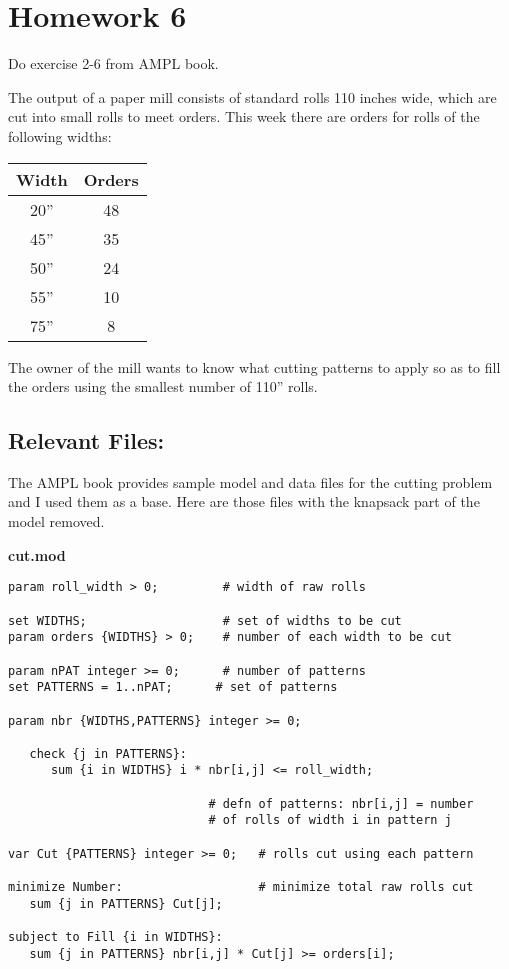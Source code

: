 \section*{Homework 6}

Do exercise 2-6 from AMPL book.

The output of a paper mill consists of standard rolls 110 inches wide, which are cut into small rolls to meet orders. This week there are orders for rolls of the following widths:

\begin{table}[!h]
	\centering
	\begin{tabular}{|cc|}
		\hline
		Width & Orders \\
		\hline
		20'' & 48 \\
		45'' & 35 \\
		50'' & 24 \\
		55'' & 10 \\
		75'' & 8 \\
		\hline
	\end{tabular}
\end{table}

The owner of the mill wants to know what cutting patterns to apply so as to fill the orders using the smallest number of 110'' rolls.

\subsection*{Relevant Files:}

The AMPL book provides sample model and data files for the cutting problem and I used them as a base. Here are those files with the knapsack part of the model removed.

\noindent\textbf{cut.mod}

\begin{lstlisting}
param roll_width > 0;         # width of raw rolls

set WIDTHS;                   # set of widths to be cut
param orders {WIDTHS} > 0;    # number of each width to be cut

param nPAT integer >= 0;      # number of patterns
set PATTERNS = 1..nPAT;      # set of patterns

param nbr {WIDTHS,PATTERNS} integer >= 0;

   check {j in PATTERNS}:
      sum {i in WIDTHS} i * nbr[i,j] <= roll_width;

                            # defn of patterns: nbr[i,j] = number
                            # of rolls of width i in pattern j

var Cut {PATTERNS} integer >= 0;   # rolls cut using each pattern

minimize Number:                   # minimize total raw rolls cut
   sum {j in PATTERNS} Cut[j];

subject to Fill {i in WIDTHS}:
   sum {j in PATTERNS} nbr[i,j] * Cut[j] >= orders[i];
\end{lstlisting}

